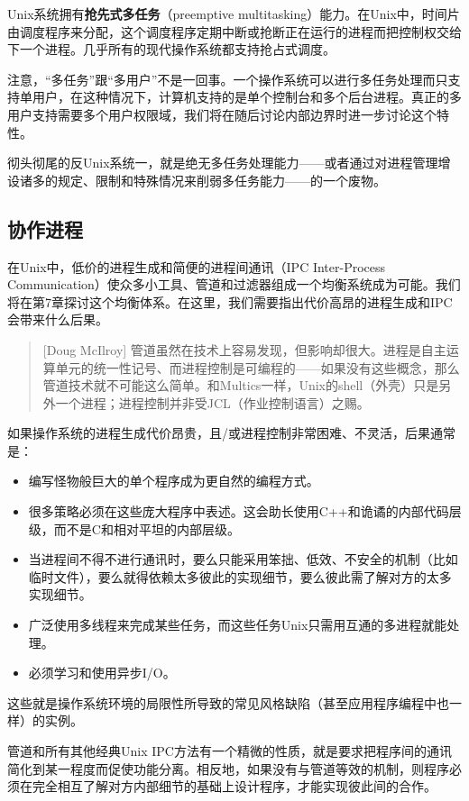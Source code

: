 \documentclass[12pt,oneside]{book}
\begin{document}
\begin{common-format}
Unix系统拥有\textbf{抢先式多任务}（preemptive multitasking）能力。在Unix中，时间片由调度程序来分配，这个调度程序定期中断或抢断正在运行的进程而把控制权交给下一个进程。几乎所有的现代操作系统都支持抢占式调度。

注意，“多任务”跟“多用户”不是一回事。一个操作系统可以进行多任务处理而只支持单用户，在这种情况下，计算机支持的是单个控制台和多个后台进程。真正的多用户支持需要多个用户权限域，我们将在随后讨论内部边界时进一步讨论这个特性。

彻头彻尾的反Unix系统一，就是绝无多任务处理能力——或者通过对进程管理增设诸多的规定、限制和特殊情况来削弱多任务能力——的一个废物。

\subsection{协作进程}
在Unix中，低价的进程生成和简便的进程间通讯（IPC Inter-Process Communication）使众多小工具、管道和过滤器组成一个均衡系统成为可能。我们将在第7章探讨这个均衡体系。在这里，我们需要指出代价高昂的进程生成和IPC会带来什么后果。

\begin{quote}[Doug McIlroy]
管道虽然在技术上容易发现，但影响却很大。进程是自主运算单元的统一性记号、而进程控制是可编程的——如果没有这些概念，那么管道技术就不可能这么简单。和Multics一样，Unix的shell（外壳）只是另外一个进程；进程控制并非受JCL（作业控制语言）之赐。
\end{quote}

如果操作系统的进程生成代价昂贵，且/或进程控制非常困难、不灵活，后果通常是：
\begin{itemize}
\item 编写怪物般巨大的单个程序成为更自然的编程方式。
\item 很多策略必须在这些庞大程序中表述。这会助长使用C++和诡谲的内部代码层级，而不是C和相对平坦的内部层级。
\item 当进程间不得不进行通讯时，要么只能采用笨拙、低效、不安全的机制（比如临时文件），要么就得依赖太多彼此的实现细节，要么彼此需了解对方的太多实现细节。
\item 广泛使用多线程来完成某些任务，而这些任务Unix只需用互通的多进程就能处理。
\item 必须学习和使用异步I/O。
\end{itemize}

这些就是操作系统环境的局限性所导致的常见风格缺陷（甚至应用程序编程中也一样）的实例。

管道和所有其他经典Unix IPC方法有一个精微的性质，就是要求把程序间的通讯简化到某一程度而促使功能分离。相反地，如果没有与管道等效的机制，则程序必须在完全相互了解对方内部细节的基础上设计程序，才能实现彼此间的合作。


\end{common-format}
\end{document}
